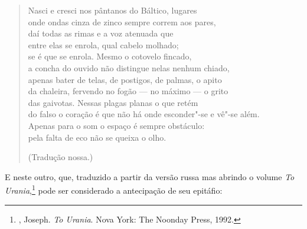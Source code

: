 \begin{verse}
Nasci e cresci nos pântanos do Báltico, \qb{}lugares \\
onde ondas cinza de zinco sempre correm \qb{}aos pares, \\
daí todas as rimas e a voz atenuada que \\
entre elas se enrola, qual cabelo molhado; \\
se é que se enrola. Mesmo o cotovelo \qb{}fincado, \\
a concha do ouvido não distingue nelas \qb{}nenhum chiado, \\
apenas bater de telas, de postigos, \qb{}de palmas, o apito \\
da chaleira, fervendo no fogão --- no máximo \qb{}--- o grito \\
das gaivotas. Nessas plagas planas o que \qb{}retém \\
do falso o coração é que não há onde \qb{}esconder"-se e vê"-se além. \\
Apenas para o som o espaço é sempre \qb{}obstáculo: \\
pela falta de eco não se queixa o olho.

(Tradução nossa.)
\end{verse}

E neste outro, que, traduzido a partir da versão russa mas abrindo o 
volume \emph{To Urania},\footnote{, Joseph. 
\emph{To Urania}. Nova York: The Noonday Press, 1992.} pode ser
 considerado a antecipação de seu epitáfio:

